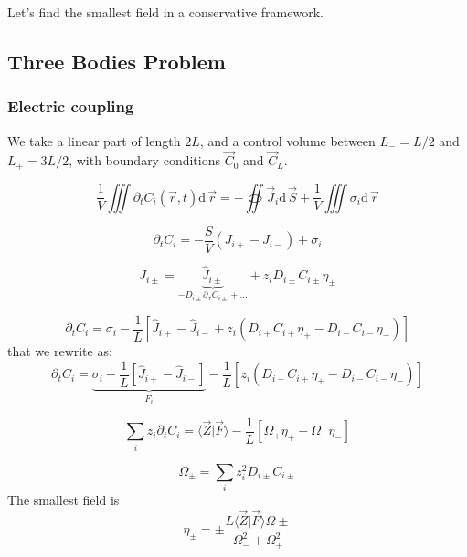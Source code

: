 \documentclass[aps,12pt]{revtex4}
\begin{document}
Let's find the smallest field in a conservative framework.

\subsection{Three Bodies Problem}

\subsubsection{Electric coupling}
We take a linear part of length $2L$, and a control volume between $L_-=L/2$ and $L_+=3L/2$,
with boundary conditions $\vec C_0$ and $\vec C_L$.

\begin{equation}
	\dfrac{1}{V} \iiint \partial_t C_i(\vec r,t)  \mathrm{d}\, \vec r
	= - \oiint  	\vec{J}_i \mathrm{d}\, \vec S + \dfrac{1}{V} \iiint \sigma_i \mathrm{d}\, \vec r
\end{equation}
 
\begin{equation}
	\partial_t C_i = -\dfrac{S}{V}(J_{i+}-J_{i-}) + \sigma_i
\end{equation}

\begin{equation}
	J_{i\pm} = \underbrace{\hat J_{i\pm}}_{-D_{i\pm} \partial_x C_{i\pm}+\ldots} + z_i D_{i\pm} C_{i\pm} \eta_\pm
\end{equation}

\begin{equation}
	\partial_t C_i = \sigma_i -\dfrac{1}{L} \left[ \hat J_{i+}- \hat J_{i-} + z_i (D_{i+} C_{i+} \eta_+ - D_{i-}C_{i-} \eta_-) \right] 
\end{equation}
that we rewrite as:
\begin{equation}
	\partial_t C_i =
	 \underbrace{\sigma_i -\dfrac{1}{L} \left[ \hat J_{i+}- \hat J_{i-} \right]}_{F_i} 
	 - \dfrac{1}{L}  \left[ z_i (D_{i+} C_{i+} \eta_+ - D_{i-}C_{i-} \eta_-)\right] 
\end{equation}


\begin{equation}
	\sum_i z_i \partial_t C_i =  \langle \vec Z \vert \vec F \rangle - \dfrac{1}{L} \left[ \Omega_+ \eta_{+} - \Omega_- \eta_-\right]
\end{equation}

\begin{equation}
	\Omega_\pm = \sum_i z_i^2 D_{i\pm} C_{i\pm}
\end{equation}
The smallest field is 
\begin{equation}
	\eta_\pm = \pm \dfrac{L \langle \vec Z \vert \vec F \rangle \Omega\pm}{\Omega_-^2+\Omega_+^2}
\end{equation}
\end{document}
